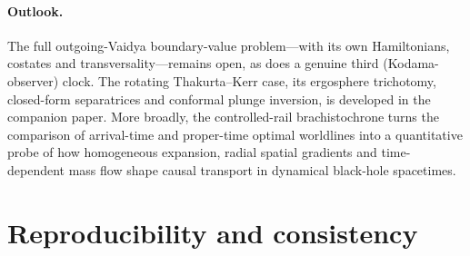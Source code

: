 \documentclass[12pt]{iopart}
\begin{document}
\paragraph{Outlook.} The full outgoing-Vaidya boundary-value problem---with its own
Hamiltonians, costates and transversality---remains open, as does a genuine third
(Kodama-observer) clock. The rotating Thakurta--Kerr case, its ergosphere trichotomy,
closed-form separatrices and conformal plunge inversion, is developed in the companion
paper. More broadly, the controlled-rail brachistochrone turns the comparison of
arrival-time and proper-time optimal worldlines into a quantitative probe of how
homogeneous expansion, radial spatial gradients and time-dependent mass flow shape causal
transport in dynamical black-hole spacetimes.


\appendix
\section{Reproducibility and consistency}
\label{app:validation}
\end{document}
